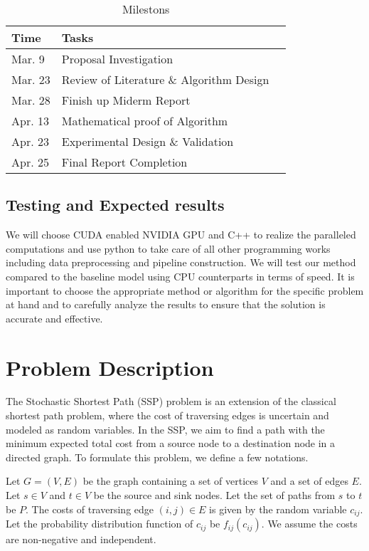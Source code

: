 \documentclass{article}
\begin{document}
\begin{table}
  \caption{Milestons}
  \label{Milestons}
  \centering
  \begin{tabular}{lll}
    \toprule
    \cmidrule(r){1-2}
    Time     & Tasks \\
    \midrule
    Mar. 9 & Proposal Investigation    \\
    Mar. 23 & Review of Literature \& Algorithm Design   \\
    Mar. 28 & Finish up Miderm Report  \\
    Apr. 13 & Mathematical proof of Algorithm  \\
    Apr. 23 & Experimental Design \& Validation \\
    Apr. 25 & Final Report Completion \\
    \bottomrule
  \end{tabular}
\end{table}

\subsection{Testing and Expected results}

We will choose CUDA enabled NVIDIA GPU and C++ to realize the paralleled computations and use python 
to take care of all other programming works including data preprocessing and pipeline construction. 
We will test our method compared to the baseline model using CPU counterparts in terms of speed. 
It is important to choose the appropriate method or algorithm for the specific problem at hand and to 
carefully analyze the results to ensure that the solution is accurate and effective. 

\section{Problem Description}
The Stochastic Shortest Path (SSP) problem is an extension of the classical shortest path problem, 
where the cost of traversing edges is uncertain and modeled as random variables. 
In the SSP, we aim to find a path with the minimum expected total cost from a source node to a destination node in a directed graph. 
To formulate this problem, we define a few notations.

Let $G=(V,E)$ be the graph containing a set of vertices $V$ and a set of edges $E$. Let $s \in V$ and $t \in V$ be the source and sink nodes. 
Let the set of paths from $s$ to $t$ be $P$. The costs of traversing edge $(i,j) \in E$ is given by the random variable $c_{ij}$. Let the probability distribution function of $c_{ij}$ be $f_{ij}(c_{ij})$. We assume the costs are non-negative and independent. 
\end{document}
